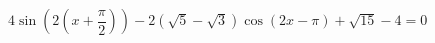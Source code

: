 \begin{ex}[type=equation]
	\begin{condition}
		$\ 4\sin{\left(2\left(x + \dfrac{\pi}{2}\right)\right)} -2\left(\sqrt{5}-\sqrt{3}\right) \cos{\left(2x -\pi\right)} + \sqrt{15} - 4 = 0$
	\end{condition}
\end{ex}